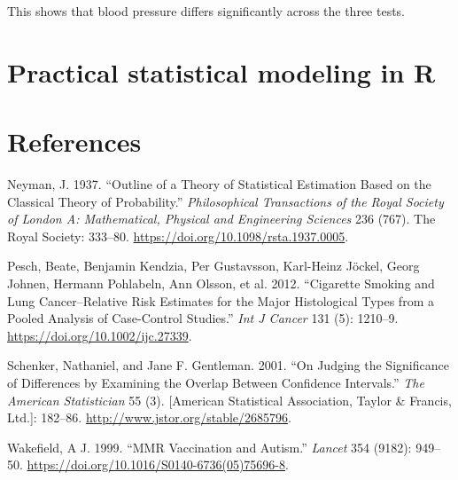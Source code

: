 \documentclass[12pt,]{book}
\begin{document}
This shows that blood pressure differs significantly across the three tests.

\hypertarget{practical-statistical-modeling-in-r}{%
\chapter{Practical statistical modeling in R}\label{practical-statistical-modeling-in-r}}

\hypertarget{references}{%
\chapter{References}\label{references}}

\hypertarget{refs}{}
\leavevmode\hypertarget{ref-Neyman37}{}%
Neyman, J. 1937. ``Outline of a Theory of Statistical Estimation Based on the Classical Theory of Probability.'' \emph{Philosophical Transactions of the Royal Society of London A: Mathematical, Physical and Engineering Sciences} 236 (767). The Royal Society: 333--80. \url{https://doi.org/10.1098/rsta.1937.0005}.

\leavevmode\hypertarget{ref-pesc:kend:gust:2012}{}%
Pesch, Beate, Benjamin Kendzia, Per Gustavsson, Karl-Heinz Jöckel, Georg Johnen, Hermann Pohlabeln, Ann Olsson, et al. 2012. ``Cigarette Smoking and Lung Cancer--Relative Risk Estimates for the Major Histological Types from a Pooled Analysis of Case-Control Studies.'' \emph{Int J Cancer} 131 (5): 1210--9. \url{https://doi.org/10.1002/ijc.27339}.

\leavevmode\hypertarget{ref-sche:gent:2001}{}%
Schenker, Nathaniel, and Jane F. Gentleman. 2001. ``On Judging the Significance of Differences by Examining the Overlap Between Confidence Intervals.'' \emph{The American Statistician} 55 (3). {[}American Statistical Association, Taylor \& Francis, Ltd.{]}: 182--86. \url{http://www.jstor.org/stable/2685796}.

\leavevmode\hypertarget{ref-wake:1999}{}%
Wakefield, A J. 1999. ``MMR Vaccination and Autism.'' \emph{Lancet} 354 (9182): 949--50. \url{https://doi.org/10.1016/S0140-6736(05)75696-8}.
\end{document}
